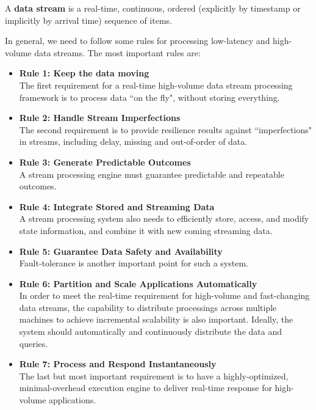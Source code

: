 \documentclass[	DIV=calc,%
							paper=a4,%
							fontsize=11pt,%
							twocolumn]{scrartcl}	 					%
\begin{document}
A \textbf{data stream} is a real-time, continuous, ordered (explicitly by timestamp or implicitly by arrival time) sequence of items.



In general, we need to follow some rules for processing low-latency and high-volume data streams. The most important rules are:

\begin{itemize}

\item \textbf{Rule 1: Keep the data moving} \\
The first requirement for a real-time high-volume data stream processing framework is to process data ``on the fly", without storing everything. 

\item \textbf{Rule 2: Handle Stream Imperfections}\\
The second requirement is to provide resilience results against ``imperfections" in streams, including delay, missing and out-of-order of data.

\item \textbf{Rule 3: Generate Predictable Outcomes}\\
A stream processing engine must guarantee predictable and repeatable outcomes. 

\item \textbf{Rule 4: Integrate Stored and Streaming Data }\\
A stream processing system also needs to efficiently store, access, and modify state information, and combine it with new coming streaming data. 

\item \textbf{Rule 5: Guarantee Data Safety and Availability}\\
Fault-tolerance is another important point for such a system.

\item \textbf{Rule 6:  Partition and Scale Applications Automatically}\\
In order to meet the real-time requirement for high-volume and fast-changing data streams, the capability to distribute processings across multiple machines to achieve incremental scalability is also important. Ideally, the system should automatically and continuously distribute the data and queries.

\item \textbf{Rule 7: Process and Respond Instantaneously}\\
The last but most important requirement is to have a highly-optimized, minimal-overhead execution engine to deliver real-time response for high-volume applications.
\end{itemize}
\end{document}
